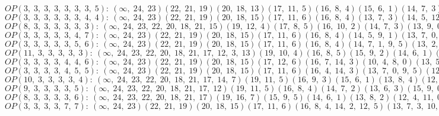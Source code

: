 $OP(3, \;3, \;3, \;3, \;3, \;3, \;3, \;5): \:(\infty, \;24, \;23)(22, \;21, \;19)(20, \;18, \;13)(17, \;11, \;5)(16, \;8, \;4)(15, \;6, \;1)(14, \;7, \;3)(12, \;9, \;0, \;10, \;2)$\\
$OP(3, \;3, \;3, \;3, \;3, \;3, \;4, \;4): \:(\infty, \;24, \;23)(22, \;21, \;19)(20, \;18, \;15)(17, \;11, \;6)(16, \;8, \;4)(13, \;7, \;3)(14, \;5, \;12, \;1)(10, \;2, \;9, \;0)$\\
$OP(8, \;3, \;3, \;3, \;3, \;3, \;3): \:(\infty, \;24, \;23, \;22, \;20, \;18, \;21, \;15)(19, \;12, \;4)(17, \;8, \;5)(16, \;10, \;2)(14, \;7, \;3)(13, \;9, \;0)(11, \;6, \;1)$\\
$OP(3, \;3, \;3, \;3, \;3, \;4, \;7): \:(\infty, \;24, \;23)(22, \;21, \;19)(20, \;18, \;15)(17, \;11, \;6)(16, \;8, \;4)(14, \;5, \;9, \;1)(13, \;7, \;0, \;10, \;3, \;12, \;2)$\\
$OP(3, \;3, \;3, \;3, \;3, \;5, \;6): \:(\infty, \;24, \;23)(22, \;21, \;19)(20, \;18, \;15)(17, \;11, \;6)(16, \;8, \;4)(14, \;7, \;1, \;9, \;5)(13, \;2, \;12, \;3, \;10, \;0)$\\
$OP(11, \;3, \;3, \;3, \;3, \;3): \:(\infty, \;24, \;23, \;22, \;20, \;18, \;21, \;17, \;12, \;3, \;13)(19, \;10, \;4)(16, \;8, \;5)(15, \;9, \;2)(14, \;6, \;1)(11, \;7, \;0)$\\
$OP(3, \;3, \;3, \;3, \;4, \;4, \;6): \:(\infty, \;24, \;23)(22, \;21, \;19)(20, \;18, \;15)(17, \;12, \;6)(16, \;7, \;14, \;3)(10, \;4, \;8, \;0)(13, \;5, \;9, \;2, \;11, \;1)$\\
$OP(3, \;3, \;3, \;3, \;4, \;5, \;5): \:(\infty, \;24, \;23)(22, \;21, \;19)(20, \;18, \;15)(17, \;11, \;6)(16, \;4, \;14, \;3)(13, \;7, \;0, \;9, \;5)(12, \;8, \;1, \;10, \;2)$\\
$OP(10, \;3, \;3, \;3, \;3, \;4): \:(\infty, \;24, \;23, \;22, \;20, \;18, \;21, \;17, \;14, \;7)(19, \;11, \;5)(16, \;9, \;3)(15, \;6, \;1)(13, \;8, \;4)(12, \;2, \;10, \;0)$\\
$OP(9, \;3, \;3, \;3, \;3, \;5): \:(\infty, \;24, \;23, \;22, \;20, \;18, \;21, \;17, \;12)(19, \;11, \;5)(16, \;8, \;4)(14, \;7, \;2)(13, \;6, \;3)(15, \;9, \;0, \;10, \;1)$\\
$OP(8, \;3, \;3, \;3, \;3, \;6): \:(\infty, \;24, \;23, \;22, \;20, \;18, \;21, \;17)(19, \;16, \;7)(15, \;9, \;5)(14, \;6, \;1)(13, \;8, \;2)(12, \;4, \;11, \;0, \;10, \;3)$\\
$OP(3, \;3, \;3, \;3, \;7, \;7): \:(\infty, \;24, \;23)(22, \;21, \;19)(20, \;18, \;15)(17, \;11, \;6)(16, \;8, \;4, \;14, \;2, \;12, \;5)(13, \;7, \;3, \;10, \;1, \;9, \;0)$\\
